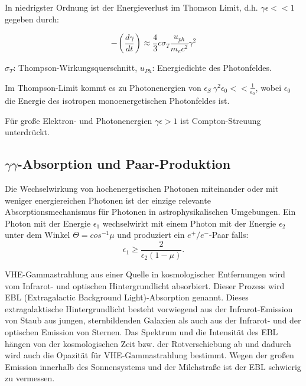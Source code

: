In niedrigster Ordnung ist der Energieverlust im Thomson Limit, d.h. $\gamma \epsilon <<1$ gegeben durch:

\begin{equation}
-\left(\frac{d\gamma}{dt} \right) \approx \frac{4}{3} c \sigma_T \frac{u_{ph}}{m_e c^2} \gamma^2
\end{equation}

\begin{center}
 \begin{tiny}
  $\sigma_T$: Thompson-Wirkungsquerschnitt, $u_{Ph}$: Energiedichte des Photonfeldes.
 \end{tiny}
\end{center}

Im Thompson-Limit kommt es zu Photonenergien von $\epsilon_S ~\gamma^2 \epsilon_0 << \frac{1}{\epsilon_0} $, wobei $\epsilon_0$ die Energie des isotropen monoenergetischen Photonfeldes ist.\cite{RelativisticJets}

Für große Elektron- und Photonenergien $\gamma \epsilon > 1$ ist Compton-Streuung unterdrückt.\cite{RelativisticJets}


\subsection{$\gamma\gamma$-Absorption und Paar-Produktion}
Die Wechselwirkung von hochenergetischen Photonen miteinander oder mit weniger energiereichen Photonen ist der einzige relevante Absorptionsmechanismus für Photonen in astrophysikalischen Umgebungen.
Ein Photon mit der Energie $\epsilon_1$ wechselwirkt mit einem Photon mit der Energie $\epsilon_2$ unter dem Winkel $\Theta=cos^{-1}\mu$ und produziert ein $e^+/e^-$-Paar falls:
\begin{equation}
 \epsilon_1 \geq \frac{2}{\epsilon_2 (1-\mu)}.
\end{equation}

VHE-Gammastrahlung aus einer Quelle in kosmologischer Entfernungen wird vom Infrarot- und optischen Hintergrundlicht absorbiert. 
Dieser Prozess wird EBL (Extragalactic Background Light)-Absorption genannt. 
Dieses extragalaktische Hintergrundlicht besteht vorwiegend aus der Infrarot-Emission von Staub aus jungen, sternbildenden Galaxien als auch aus der Infrarot- und der optischen Emission von Sternen.
Das Spektrum und die Intensität des EBL hängen von der kosmologischen Zeit bzw. der Rotverschiebung ab und dadurch wird auch die Opazität für VHE-Gammastrahlung bestimmt.
Wegen der großen Emission innerhalb des Sonnensystems und der Milchstraße ist der EBL schwierig zu vermessen.\cite{RelativisticJets}



